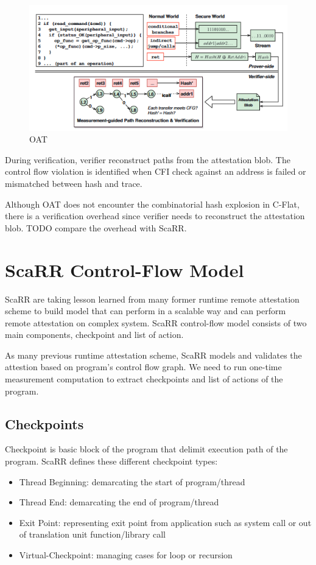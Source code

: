 \begin{figure}[htbp]
\centerline{\includegraphics[scale=.5]{Figures/oat.png}}
\caption{OAT}
\label{fig:4-4}
\end{figure}

During verification, verifier reconstruct paths from the attestation blob. The control flow violation is identified when CFI check against an address is failed or mismatched between hash and trace.

Although OAT does not encounter the combinatorial hash explosion in C-Flat, there is a verification overhead since verifier needs to reconstruct the attestation blob. TODO compare the overhead with ScaRR.

\section{ScaRR Control-Flow Model}

ScaRR \cite{toffaliniScaRRScalableRuntime2019} are taking lesson learned from many former runtime remote attestation scheme to build model that can perform in a scalable way and can perform remote attestation on complex system. ScaRR control-flow model consists of two main components, checkpoint and list of action. 

As many previous runtime attestation scheme, ScaRR models and validates the attestion based on program's control flow graph. We need to run one-time measurement computation to extract checkpoints and list of actions of the program.

\subsection{Checkpoints}
Checkpoint is basic block of the program that delimit execution path of the program. ScaRR defines these different checkpoint types:
\begin{itemize}
    \item Thread Beginning: demarcating the start of program/thread
    \item Thread End: demarcating the end of program/thread
    \item Exit Point: representing exit point from application such as system call or out of translation unit function/library call
    \item Virtual-Checkpoint: managing cases for loop or recursion
\end{itemize}

